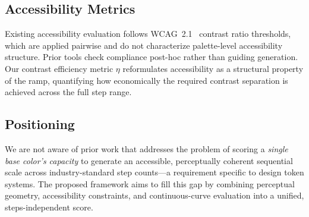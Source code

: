 \subsection{Accessibility Metrics}

Existing accessibility evaluation follows WCAG~2.1~\cite{wcag21} contrast
ratio thresholds, which are applied pairwise and do not characterize
palette-level accessibility structure. Prior tools check compliance
post-hoc rather than guiding generation. Our contrast efficiency metric
$\eta$ reformulates accessibility as a structural property of the ramp,
quantifying how economically the required contrast separation is achieved
across the full step range.

\subsection{Positioning}

We are not aware of prior work that addresses the problem of scoring a
\emph{single base color's capacity} to generate an accessible, perceptually
coherent sequential scale across industry-standard step counts---a requirement
specific to design token systems. The proposed framework aims to fill this gap
by combining perceptual geometry, accessibility constraints, and
continuous-curve evaluation into a unified, steps-independent score.
